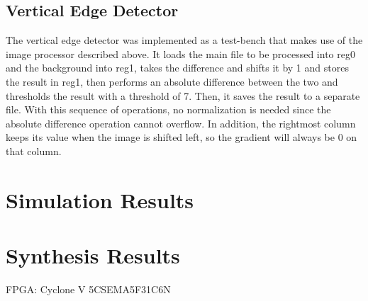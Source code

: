 \documentclass[a4paper, 10pt, titlepage]{article}
\begin{document}
\subsection{Vertical Edge Detector}

The vertical edge detector was implemented as a test-bench that makes use of the image processor described above. It loads the main file to be processed into reg0 and the background into reg1, takes the difference and shifts it by 1 and stores the result in reg1, then performs an absolute difference between the two and thresholds the result with a threshold of 7. Then, it saves the result to a separate file. With this sequence of operations, no normalization is needed since the absolute difference operation cannot overflow. In addition, the rightmost column keeps its value when the image is shifted left, so the gradient will always be 0 on that column.

\section{Simulation Results}


\section{Synthesis Results}

FPGA: Cyclone V 5CSEMA5F31C6N
\end{document}
